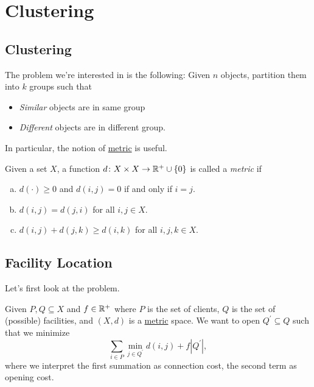 \chapter{Clustering}

\section{Clustering}
The problem we're interested in is the following: Given \(n\) objects, partition them into \(k\) groups such that
\begin{itemize}
	\item \emph{Similar} objects are in same group
	\item \emph{Different} objects are in different group.
\end{itemize}

In particular, the notion of \hyperref[def:metric]{metric} is useful.

\begin{definition}[Metric]\label{def:metric}
	Given a set \(X\), a function \(d\colon X\times X\to \mathbb{\MakeUppercase{r}} ^+ \cup \left\{ 0 \right\} \) is called a \emph{metric} if
	\begin{enumerate}[(a)]
		\item \(d(\cdot) \geq 0\) and \(d(i, j) = 0\) if and only if \(i = j\).
		\item \(d(i, j) = d(j, i)\) for all \(i, j\in X\).
		\item \(d(i, j) + d(j, k) \geq d(i, k)\) for all \(i, j, k\in X\).
	\end{enumerate}
\end{definition}

\section{Facility Location}
Let's first look at the problem.

\begin{problem}\label{prb:facility-location}
Given \(P,  Q\subseteq X\) and \(f\in \mathbb{\MakeUppercase{r}} ^+\) where \(P\) is the set of clients, \(Q\) is the set of (possible) facilities, and \((X, d)\) is a \hyperref[def:metric]{metric} space. We want to open \(Q^\prime \subseteq Q\) such that we minimize
\[
	\sum_{i\in P} \min _{j\in Q^\prime } d(i, j) + f\left\vert Q^\prime  \right\vert,
\]
where we interpret the first summation as connection cost, the second term as opening cost.
\end{problem}

